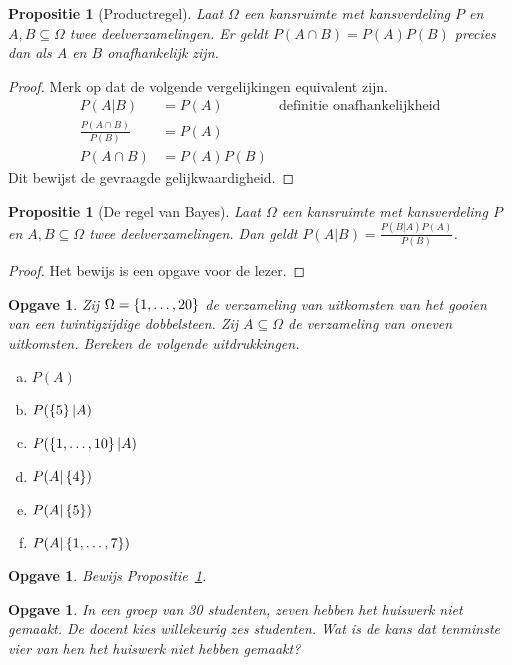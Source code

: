 \documentclass[a4paper]{book}
\newtheorem{proposition}[theorem]{Propositie}
\newtheorem{exercise}[theorem]{Opgave}
\theoremstyle{definition}
\begin{document}
\begin{proposition}[Productregel]
    Laat $\Omega$ een kansruimte met kansverdeling $P$ en $A,B \subseteq \Omega$ twee deelverzamelingen.
    Er geldt $P(A \cap B) = P(A)P(B)$ precies dan als $A$ en $B$ onafhankelijk zijn.
\end{proposition}
\begin{proof}
    Merk op dat de volgende vergelijkingen equivalent zijn.
    \begin{align*}
        P(A|B)                      &= P(A) & \text{definitie onafhankelijkheid}\\
        \frac{P(A \cap B)}{P(B)}    &= P(A) \\
        P(A \cap B)                 &= P(A)P(B)
    \end{align*}
    Dit bewijst de gevraagde gelijkwaardigheid.
\end{proof}

\begin{proposition}[De regel van Bayes]\label{bayes}
    Laat $\Omega$ een kansruimte met kansverdeling $P$ en $A,B \subseteq \Omega$ twee deelverzamelingen.
    Dan geldt $P(A|B) = \frac{P(B|A)P(A)}{P(B)}$.
\end{proposition}
\begin{proof}
    Het bewijs is een opgave voor de lezer.
\end{proof}

\begin{exercise}
    Zij $\Omega = \set{1,\dots,20}$ de verzameling van uitkomsten van het gooien van een twintigzijdige dobbelsteen.
    Zij $A \subseteq \Omega$ de verzameling van oneven uitkomsten.
    Bereken de volgende uitdrukkingen.
    \begin{enumerate}[a.]
        \item $P(A)$
        \item $P(\set{5}|A)$
        \item $P(\set{1,\dots,10}|A)$
        \item $P(A|\set{4})$
        \item $P(A|\set{5})$
        \item $P(A|\set{1,\dots,7})$
    \end{enumerate}
\end{exercise}

\begin{exercise}
    Bewijs Propositie~\ref{bayes}.
\end{exercise}

\begin{exercise}
In een groep van 30 studenten, zeven hebben het huiswerk niet gemaakt. De docent kies willekeurig zes studenten.
Wat is de kans dat tenminste vier van hen het huiswerk niet hebben gemaakt?
\end{exercise}
\end{document}
